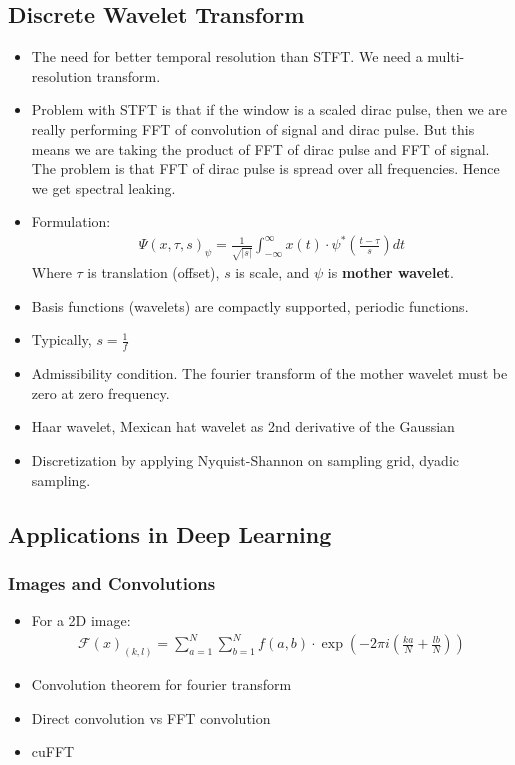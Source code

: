 \documentclass[paper=a4, fontsize=12pt]{scrartcl} %
\numberwithin{equation}{section} %
\numberwithin{figure}{section} %
\numberwithin{table}{section} %
\begin{document}
\subsection{Discrete Wavelet Transform}

\begin{itemize}
    \item The need for better temporal resolution than STFT. We need a multi-resolution transform.
    \item Problem with STFT is that if the window is a scaled dirac pulse, then we are really performing 
    FFT of convolution of signal and dirac pulse. But this means we are taking the product of FFT of dirac pulse and 
    FFT of signal. The problem is that FFT of dirac pulse is spread over all frequencies. Hence we get spectral leaking.
    \item Formulation:
    \begin{align*}
        \Psi(x, \tau, s)_\psi = \frac{1}{\sqrt{|s|}} \int_{-\infty}^{\infty} x(t) \cdot \psi^* \left( \frac{t  - \tau}{s}  \right) dt
    \end{align*}
    Where $\tau$ is translation (offset), $s$ is scale, and $\psi$ is \textbf{mother wavelet}.
    \item Basis functions (wavelets) are compactly supported, periodic functions.
    \item Typically, $\displaystyle s = \frac{1}{f}$
    \item Admissibility condition. The fourier transform of the mother wavelet must be zero at zero frequency.
    \item Haar wavelet, Mexican hat wavelet as 2nd derivative of the Gaussian
    \item Discretization by applying Nyquist-Shannon on sampling grid, dyadic sampling.
\end{itemize}

\subsection{Applications in Deep Learning}

\subsubsection{Images and Convolutions}

\begin{itemize}
    \item For a 2D image:
    \begin{align*}
        \mathcal{F}(x)_{(k, l)} = \sum_{a = 1}^N \sum_{b = 1}^N f(a, b) \cdot \exp \left( -2 \pi i \left( \frac{ka}{N} + \frac{lb}{N} \right) \right)
    \end{align*}
    \item Convolution theorem for fourier transform
    \item Direct convolution vs FFT convolution
    \item cuFFT
\end{itemize}
\end{document}
